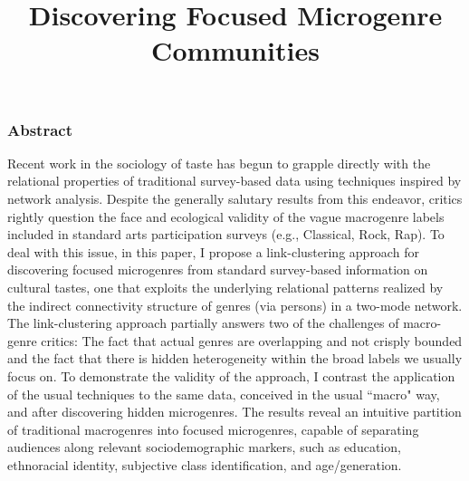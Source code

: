 \documentclass[a4paper,12pt]{extarticle}
\title{Discovering Focused Microgenre Communities}
\begin{document}
\maketitle
\subsubsection*{Abstract} 
Recent work in the sociology of taste has begun to grapple directly with the relational properties of traditional survey-based data using techniques inspired by network analysis. Despite the generally salutary results from this endeavor, critics rightly question the face and ecological validity of the vague macrogenre labels included in standard arts participation surveys (e.g., Classical, Rock, Rap). To deal with this issue, in this paper, I propose a link-clustering approach for discovering focused microgenres from standard survey-based information on cultural tastes, one that exploits the underlying relational patterns realized by the indirect connectivity structure of genres (via persons) in a two-mode network. The link-clustering approach partially answers two of the challenges of macro-genre critics: The fact that actual genres are overlapping and not crisply bounded and the fact that there is hidden heterogeneity within the broad labels we usually focus on. To demonstrate the validity of the approach, I contrast the application of the usual techniques to the same data, conceived in the usual ``macro" way, and after discovering hidden microgenres. The results reveal an intuitive partition of traditional macrogenres into focused microgenres, capable of separating audiences along relevant sociodemographic markers, such as education, ethnoracial identity, subjective class identification, and age/generation. 
\newpage
\end{document}
